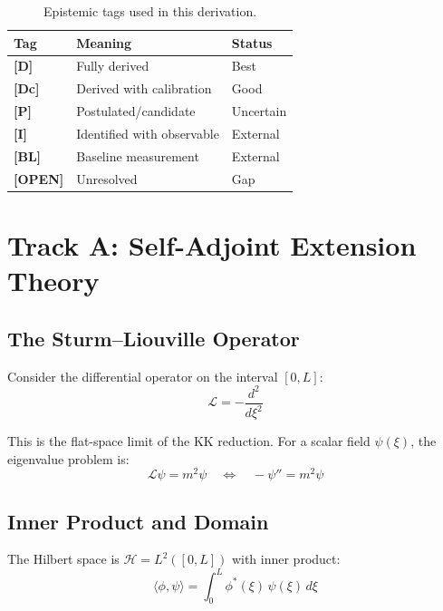 \documentclass[11pt,a4paper]{article}
\newcommand{\tagD}{\textbf{[D]}}
\newcommand{\tagDc}{\textbf{[Dc]}}
\newcommand{\tagI}{\textbf{[I]}}
\newcommand{\tagBL}{\textbf{[BL]}}
\newcommand{\tagP}{\textbf{[P]}}
\newcommand{\tagOPEN}{\textbf{[OPEN]}}
\theoremstyle{definition}
\theoremstyle{plain}
\theoremstyle{remark}
\begin{document}
\begin{table}[htbp]
\centering
\caption{Epistemic tags used in this derivation.}
\label{tab:tags}
\begin{tabular}{@{}lll@{}}
\toprule
Tag & Meaning & Status \\
\midrule
\tagD{} & Fully derived & Best \\
\tagDc{} & Derived with calibration & Good \\
\tagP{} & Postulated/candidate & Uncertain \\
\tagI{} & Identified with observable & External \\
\tagBL{} & Baseline measurement & External \\
\tagOPEN{} & Unresolved & Gap \\
\bottomrule
\end{tabular}
\end{table}

\section{Track A: Self-Adjoint Extension Theory}
\label{sec:track-a}

\subsection{The Sturm--Liouville Operator}

Consider the differential operator on the interval $[0, L]$:
\begin{equation}
\mathcal{L} = -\frac{d^2}{d\xi^2}
\label{eq:SL-operator}
\end{equation}

This is the flat-space limit of the KK reduction. For a scalar field $\psi(\xi)$,
the eigenvalue problem is:
\begin{equation}
\mathcal{L}\psi = m^2 \psi \quad \Leftrightarrow \quad -\psi'' = m^2\psi
\label{eq:eigenvalue}
\end{equation}

\subsection{Inner Product and Domain}

The Hilbert space is $\mathcal{H} = L^2([0,L])$ with inner product:
\begin{equation}
\langle \phi, \psi \rangle = \int_0^L \phi^*(\xi) \, \psi(\xi) \, d\xi
\label{eq:inner-product}
\end{equation}
\end{document}
